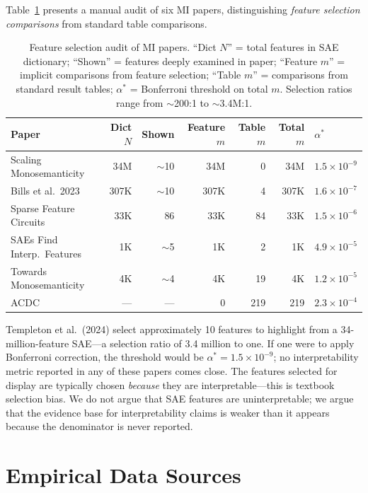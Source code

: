 \documentclass{article}
\begin{document}
Table~\ref{tab:mi_audit} presents a manual audit of six MI papers, distinguishing \textit{feature selection comparisons} from standard table comparisons.

\begin{table}[h]
\centering
\caption{Feature selection audit of MI papers. ``Dict $N$'' = total features in SAE dictionary; ``Shown'' = features deeply examined in paper; ``Feature $m$'' = implicit comparisons from feature selection; ``Table $m$'' = comparisons from standard result tables; $\alpha^*$ = Bonferroni threshold on total $m$. Selection ratios range from $\sim$200:1 to $\sim$3.4M:1.}
\label{tab:mi_audit}
\small
\begin{tabular}{@{}lrrrrrl@{}}
\toprule
Paper & Dict $N$ & Shown & Feature $m$ & Table $m$ & Total $m$ & $\alpha^*$ \\
\midrule
Scaling Monosemanticity & 34M & $\sim$10 & 34M & 0 & 34M & $1.5 \times 10^{-9}$ \\
Bills et al.\ 2023 & 307K & $\sim$10 & 307K & 4 & 307K & $1.6 \times 10^{-7}$ \\
Sparse Feature Circuits & 33K & 86 & 33K & 84 & 33K & $1.5 \times 10^{-6}$ \\
SAEs Find Interp.\ Features & 1K & $\sim$5 & 1K & 2 & 1K & $4.9 \times 10^{-5}$ \\
Towards Monosemanticity & 4K & $\sim$4 & 4K & 19 & 4K & $1.2 \times 10^{-5}$ \\
ACDC & --- & --- & 0 & 219 & 219 & $2.3 \times 10^{-4}$ \\
\bottomrule
\end{tabular}
\end{table}

Templeton et al.\ (2024) select approximately 10 features to highlight from a 34-million-feature SAE---a selection ratio of 3.4 million to one. If one were to apply Bonferroni correction, the threshold would be $\alpha^* = 1.5 \times 10^{-9}$; no interpretability metric reported in any of these papers comes close. The features selected for display are typically chosen \textit{because} they are interpretable---this is textbook selection bias. We do not argue that SAE features are uninterpretable; we argue that the evidence base for interpretability claims is weaker than it appears because the denominator is never reported.


\section{Empirical Data Sources}
\label{app:data}
\end{document}
